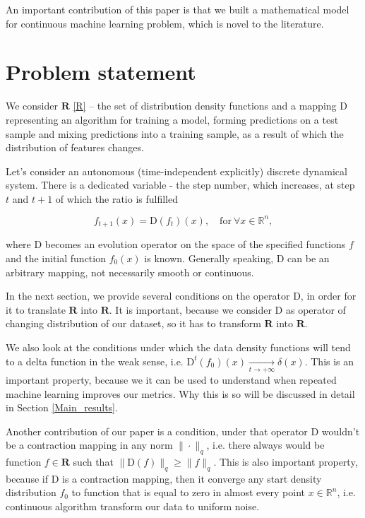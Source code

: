 \documentclass{article}
\begin{document}
    An important contribution of this paper is that  we built a mathematical model for continuous machine learning problem, which is novel to the literature.

\section{Problem statement} \label{Problem_statement}

    We consider $\mathbf{R}$ \eqref{R} -- the set of distribution density functions and a mapping $\text{D}$ representing an algorithm for training a model, forming predictions on a test sample and mixing predictions into a training sample, as a result of which the distribution of features changes.

    Let's consider an autonomous (time-independent explicitly) discrete dynamical system. There is a dedicated variable - the step number, which increases, at step $t$ and $t+1$ of which the ratio is fulfilled

    \begin{equation*}
        f_{t+1}(x) = \text{D}(f_t)(x), \quad \text{for}~ \forall x \in \mathbb{R}^n,
    \end{equation*}

    where $\text{D}$ becomes an evolution operator on the space of the specified functions $f$ and the initial function $f_0(x)$ is known. Generally speaking, $\text{D}$ can be an arbitrary mapping, not necessarily smooth or continuous.


    In the next section, we provide several conditions on the operator $\text{D}$, in order for it to translate $\mathbf{R}$ into $\mathbf{R}$. It is important, because we consider $\text{D}$ as operator of changing distribution of our dataset, so it has to transform $\mathbf{R}$ into $\mathbf{R}$.

    We also look at the conditions under which the data density functions will tend to a delta function in the weak sense, i.e. $\text{D}^t(f_0)(x) \underset{t \to +\infty}{\longrightarrow} \delta(x)$. 
    This is an important property, because we it can be used to understand when repeated machine learning improves our metrics. Why this is so will be discussed in detail in Section \ref{Main_results}.

    Another contribution of our paper is a condition, under that operator $\text{D}$ wouldn't be a contraction mapping in any norm $\|\cdot\|_q$, i.e. there always would be function $f \in \mathbf{R}$ such that $\|\text{D}(f)\|_q \geq \|f\|_q$. This is also important property, because if $\text{D}$ is a contraction mapping, then it converge any start density distribution $f_0$ to function that is equal to zero in almost every point $x \in \mathbb{R}^n$, i.e. continuous algorithm transform our data to uniform noise.
\end{document}
